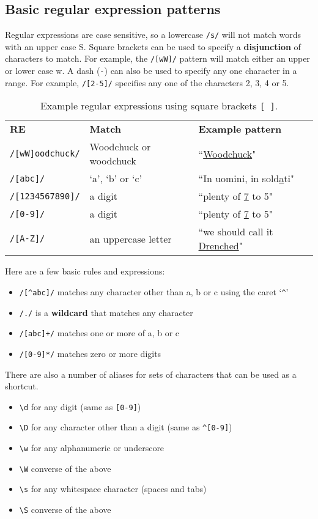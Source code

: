 \documentclass[Report.tex]{subfiles}
\begin{document}
\subsection{Basic regular expression patterns}
Regular expressions are case sensitive, so a lowercase \texttt{/s/} will not
match words with an upper case S. Square brackets can be used to specify
a \textbf{disjunction} of characters to match. For example, the \texttt{/[wW]/}
pattern will match either an upper or lower case w. A dash (\texttt{-}) can
also be used to specify any one character in a range. For example, 
\texttt{/[2-5]/} specifies any one of the characters 2, 3, 4 or 5.
\begin{table}[H]
\centering
\begin{tabular}{l l l}
\textbf{RE} & \textbf{Match} & \textbf{Example pattern} \\
\texttt{/[wW]oodchuck/} & Woodchuck or woodchuck & ``\underline{Woodchuck}" \\
\texttt{/[abc]/} & `a', `b' or `c' & ``In uomini, in sold\underline{a}ti" \\
\texttt{/[1234567890]/} & a digit & ``plenty of \underline{7} to 5" \\
\texttt{/[0-9]/} & a digit & ``plenty of \underline{7} to 5" \\
\texttt{/[A-Z]/} & an uppercase letter & ``we should call it \underline{Drenched}"
\end{tabular}
\caption{Example regular expressions using square brackets \texttt{[ ]}.}
\end{table}
Here are a few basic rules and expressions:
\begin{itemize}
\item \texttt{/[\^{}abc]/} matches any character other than a, b or c using the caret `\texttt{\^{}}'\\
\item \texttt{/./} is a \textbf{wildcard} that matches any character
\item \texttt{/[abc]+/} matches one or more of a, b or c
\item \texttt{/[0-9]*/} matches zero or more digits
\end{itemize}
There are also a number of aliases for sets of characters that can be used
as a shortcut.
\begin{itemize}
\item \texttt{\textbackslash d} for any digit (same as \texttt{[0-9]})
\item \texttt{\textbackslash D} for any character other than a digit 
(same as \texttt{\^{}[0-9]})
\item \texttt{\textbackslash w} for any alphanumeric or underscore
\item \texttt{\textbackslash W} converse of the above
\item \texttt{\textbackslash s} for any whitespace character (spaces and tabs)
\item \texttt{\textbackslash S} converse of the above
\end{itemize}
\end{document}
